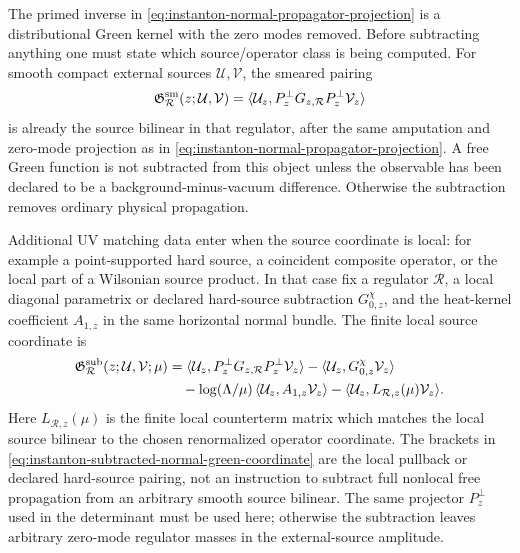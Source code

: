 \begin{controlledapproximation}
\label{ca:instanton-subtracted-normal-green-matching}
The primed inverse in
\eqref{eq:instanton-normal-propagator-projection} is a distributional Green
kernel with the zero modes removed.  Before subtracting anything one must
state which source/operator class is being computed.  For smooth compact
external sources \(\mathcal U,\mathcal V\), the smeared pairing
\[
  \mathfrak G_{\mathcal R}^{\rm sm}
  (z;\mathcal U,\mathcal V)
  =
  \langle \mathcal U_z,P_z^\perp G_{z,\mathcal R}P_z^\perp
  \mathcal V_z\rangle
\]
is already the source bilinear in that regulator, after the same amputation
and zero-mode projection as in
\eqref{eq:instanton-normal-propagator-projection}.  A free Green function is
not subtracted from this object unless the observable has been declared to be a
background-minus-vacuum difference.  Otherwise the subtraction removes
ordinary physical propagation.

Additional UV matching data enter when the source coordinate is local:
for example a point-supported hard source, a coincident composite operator, or
the local part of a Wilsonian source product.  In that case fix a regulator
\(\mathcal R\), a local diagonal parametrix or declared hard-source
subtraction \(G_{0,z}^{\chi}\), and the heat-kernel coefficient \(A_{1,z}\) in
the same horizontal normal bundle.  The finite local source coordinate is
\begin{equation}
\begin{aligned}
  \mathfrak G_{\mathcal R}^{\rm sub}
  (z;\mathcal U,\mathcal V;\mu)
  &=
  \langle \mathcal U_z,P_z^\perp G_{z,\mathcal R}P_z^\perp\mathcal V_z\rangle
  -\langle \mathcal U_z,G_{0,z}^{\chi}\mathcal V_z\rangle          \\
  &\quad
  -\log(\Lambda/\mu)\,
    \langle \mathcal U_z,A_{1,z}\mathcal V_z\rangle
  -\langle \mathcal U_z,L_{\mathcal R,z}(\mu)\mathcal V_z\rangle .
\end{aligned}
  \label{eq:instanton-subtracted-normal-green-coordinate}
\end{equation}
Here \(L_{\mathcal R,z}(\mu)\) is the finite local counterterm matrix which
matches the local source bilinear to the chosen renormalized operator
coordinate.  The brackets in
\eqref{eq:instanton-subtracted-normal-green-coordinate} are the local pullback
or declared hard-source pairing, not an instruction to subtract full
nonlocal free propagation from an arbitrary smooth source bilinear.
The same projector \(P_z^\perp\) used in the determinant must be used here;
otherwise the subtraction leaves arbitrary zero-mode regulator masses in the
external-source amplitude.


\end{controlledapproximation}

